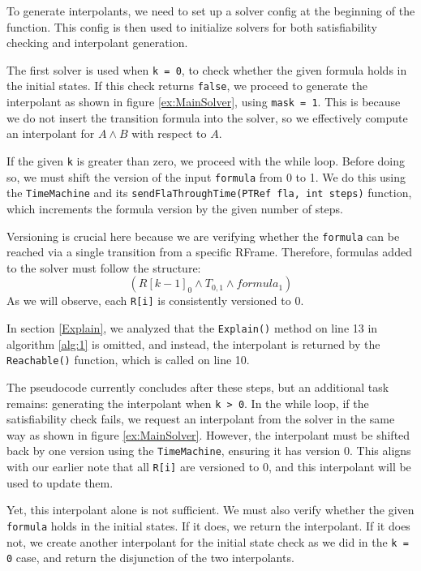 To generate interpolants, we need to set up a solver config at the beginning of
the function. This config is then used to initialize solvers for both
satisfiability checking and interpolant generation.

The first solver is used when \texttt{k = 0}, to check whether the given
formula holds in the initial states. If this check returns \texttt{false}, we
proceed to generate the interpolant as shown in
figure \ref{ex:MainSolver}, using
\texttt{mask = 1}. This is because we do not insert the transition formula into
the solver, so we effectively compute an interpolant for $A \land B$ with
respect to $A$.

If the given \texttt{k} is greater than zero, we proceed with the while loop.
Before doing so, we must shift the version of the input \texttt{formula} from 0
to 1. We do this using the \texttt{TimeMachine} and its
\texttt{sendFlaThroughTime(PTRef fla, int steps)} function, which increments
the formula version by the given number of steps.

Versioning is crucial here because we are verifying whether the
\texttt{formula} can be reached via a single transition from a specific RFrame.
Therefore, formulas added to the solver must follow the structure:  
\[
(R[k{-}1]_0 \wedge T_{0,1} \wedge formula_1)
\]  
As we will observe, each \texttt{R[i]} is consistently versioned to 0.

In section \ref{Explain}, we analyzed that the
\texttt{Explain()} method on line 13 in algorithm \ref{alg:1}
is omitted, and instead, the interpolant is returned
by the \texttt{Reachable()} function, which is called on line 10.

The pseudocode currently concludes after these steps, but an additional task
remains: generating the interpolant when \texttt{k > 0}. In the while loop, if
the satisfiability check fails, we request an interpolant from the solver in
the same way as shown in
figure \ref{ex:MainSolver}. However, the
interpolant must be shifted back by one version using the \texttt{TimeMachine},
ensuring it has version 0. This aligns with our earlier note that all
\texttt{R[i]} are versioned to 0, and this interpolant will be used to update
them.

Yet, this interpolant alone is not sufficient. We must also verify whether the
given \texttt{formula} holds in the initial states. If it does, we return the
interpolant. If it does not, we create another interpolant for the initial
state check as we did in the \texttt{k = 0} case, and return the disjunction of
the two interpolants.

